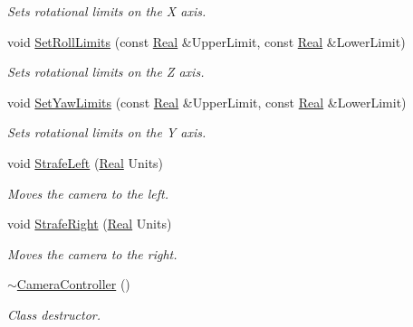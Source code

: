 \begin{DoxyCompactItemize}
\begin{DoxyCompactList}\small\item\em Sets rotational limits on the X axis. \item\end{DoxyCompactList}\item 
void \hyperlink{classphys_1_1CameraController_a047f16cf47f9648472db34fc8337bd45}{SetRollLimits} (const \hyperlink{namespacephys_af7eb897198d265b8e868f45240230d5f}{Real} \&UpperLimit, const \hyperlink{namespacephys_af7eb897198d265b8e868f45240230d5f}{Real} \&LowerLimit)
\begin{DoxyCompactList}\small\item\em Sets rotational limits on the Z axis. \item\end{DoxyCompactList}\item 
void \hyperlink{classphys_1_1CameraController_a0c19fba402f176361aea139ead5a9a40}{SetYawLimits} (const \hyperlink{namespacephys_af7eb897198d265b8e868f45240230d5f}{Real} \&UpperLimit, const \hyperlink{namespacephys_af7eb897198d265b8e868f45240230d5f}{Real} \&LowerLimit)
\begin{DoxyCompactList}\small\item\em Sets rotational limits on the Y axis. \item\end{DoxyCompactList}\item 
void \hyperlink{classphys_1_1CameraController_a1b2e0c40120c3604f1929d5fac3cd61f}{StrafeLeft} (\hyperlink{namespacephys_af7eb897198d265b8e868f45240230d5f}{Real} Units)
\begin{DoxyCompactList}\small\item\em Moves the camera to the left. \item\end{DoxyCompactList}\item 
void \hyperlink{classphys_1_1CameraController_ad494cf9a1e3e233319799116424ad43f}{StrafeRight} (\hyperlink{namespacephys_af7eb897198d265b8e868f45240230d5f}{Real} Units)
\begin{DoxyCompactList}\small\item\em Moves the camera to the right. \item\end{DoxyCompactList}\item 
\hypertarget{classphys_1_1CameraController_afe0cb476611eadd8bf27480f59162db7}{
\hyperlink{classphys_1_1CameraController_afe0cb476611eadd8bf27480f59162db7}{$\sim$CameraController} ()}
\label{classphys_1_1CameraController_afe0cb476611eadd8bf27480f59162db7}

\begin{DoxyCompactList}\small\item\em Class destructor. \item\end{DoxyCompactList}\end{DoxyCompactItemize}
